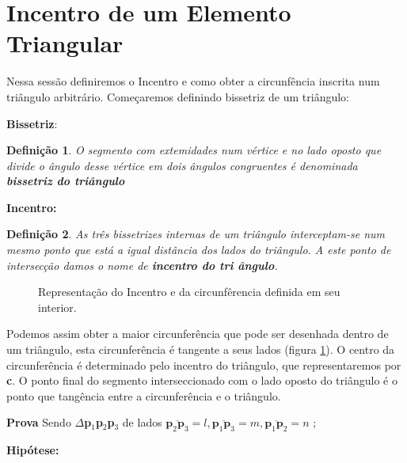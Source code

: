 \documentclass[12pt,a4paper]{book}
\newtheorem{Def}{Defini\c{c}\~{a}o}
\begin{document}
 

\section{Incentro de um Elemento Triangular}

Nessa sess\~{a}o definiremos o Incentro e como obter a circunf\^{e}ncia
inscrita num tri\^{a}ngulo arbitr\'{a}rio. Come\c{c}aremos definindo
bissetriz de um tri\^angulo:

\textbf{Bissetriz}:

\begin{Def}
O segmento com extemidades num \textit{v\'{e}rtice} e no lado oposto que
divide o \^{a}ngulo desse \textit{v\'{e}rtice} em dois \^{a}ngulos congruentes 
\'{e} denominada \textbf{bissetriz do tri\^{a}ngulo}
\end{Def}

\textbf{Incentro:}

\begin{Def}
As tr\^{e}s bissetrizes internas de um tri\^{a}ngulo interceptam-se num
mesmo ponto que est\'{a} a igual dist\^{a}ncia dos lados do tri\^{a}ngulo. A
este ponto de intersec\c{c}\~{a}o damos o nome de \textbf{incentro do tri%
\^{a}ngulo}.
\end{Def}

\begin{figure}[htbp]
  \begin{center}
    \leavevmode
    
    \caption{Representa\c{c}\~{a}o do Incentro e da circunf\^{e}rencia definida em 
	              seu interior.}
    \label{fig4_chapter2}
  \end{center}
\end{figure}


Podemos assim obter a maior circunfer\^{e}ncia que pode ser desenhada dentro
de um tri\^{a}ngulo, esta circunfer\^{e}ncia \'{e} tangente a seus lados
(figura \ref{fig4_chapter2}). O centro da circunfer\^{e}ncia \'{e} determinado pelo
incentro do tri\^{a}ngulo, que representaremos por \textbf{c}. O ponto final
do segmento interseccionado com o lado oposto do tri\^{a}ngulo \'{e} o ponto
que tang\^{e}ncia entre a circunfer\^{e}ncia e o tri\^{a}ngulo.


{\bf Prova}
 Sendo $\Delta $\textbf{p}$_{1}$\textbf{p}$_{2}$\textbf{p}$_{3}$
de lados $\overline{\mathbf{p}_{2}\mathbf{p}_{3}}=l,\overline{\mathbf{p}_{1}%
\mathbf{p}_{3}}=m,\overline{\mathbf{p}_{1}\mathbf{p}_{2}}=n$ ;

\textbf{Hip\'{o}tese: }
\end{document}
